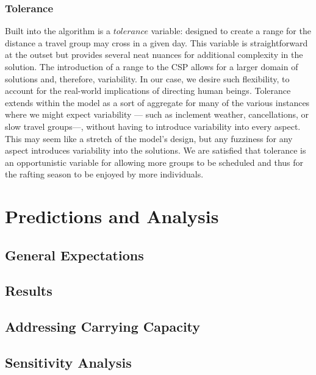 \documentclass[11pt]{article} %
\begin{document}
\subsubsection{Tolerance}
Built into the algorithm is a $tolerance$ variable: designed to create a
range for the distance a travel group may cross in a given day.  This variable
is straightforward at the outset but provides several neat nuances for additional
complexity in the solution.  The introduction of a range to the CSP allows
for a larger domain of solutions and, therefore, variability.  In our case,
we desire such flexibility, to account for the real-world implications of
directing human beings.  Tolerance extends within the model as a sort of
aggregate for many of the various instances where we might expect variability
--- such as inclement weather, cancellations, or slow travel groups---,
without having to introduce variability into every aspect.  This may seem
like a stretch of the model's design, but any fuzziness for
any aspect introduces variability into the solutions.  We are satisfied that
tolerance is an opportunistic variable for allowing more groups to be
scheduled and thus for the rafting season to be enjoyed by more individuals.



\section{Predictions and Analysis}


\subsection{General Expectations}
\label{sec:expectations}

\subsection{Results}
\label{sec:results}

\subsection{Addressing Carrying Capacity}
\label{sec:capacity}

\subsection{Sensitivity Analysis}
\label{sec:sensitivity}
\end{document}
